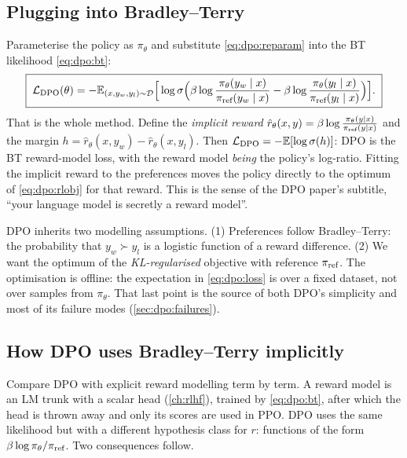 \subsection{Plugging into Bradley--Terry}

Parameterise the policy as $\pi_\theta$ and substitute \eqref{eq:dpo:reparam} into the BT
likelihood \eqref{eq:dpo:bt}:
\begin{equation}
\boxed{\;
\mathcal{L}_{\text{DPO}}(\theta) = -\mathbb{E}_{(x,y_w,y_l)\sim\mathcal{D}}\Big[\log\sigma\Big(
\beta\log\frac{\pi_\theta(y_w\mid x)}{\pi_{\text{ref}}(y_w\mid x)}
-\beta\log\frac{\pi_\theta(y_l\mid x)}{\pi_{\text{ref}}(y_l\mid x)}\Big)\Big].\;}
\label{eq:dpo:loss}
\end{equation}
That is the whole method. Define the \emph{implicit reward}
$\hat r_\theta(x,y)=\beta\log\frac{\pi_\theta(y\mid x)}{\pi_{\text{ref}}(y\mid x)}$ and the margin
$h=\hat r_\theta(x,y_w)-\hat r_\theta(x,y_l)$. Then $\mathcal{L}_{\text{DPO}}=-\mathbb{E}[\log\sigma(h)]$:
DPO is the BT reward-model loss, with the reward model \emph{being} the policy's log-ratio. Fitting the
implicit reward to the preferences moves the policy directly to the optimum of
\eqref{eq:dpo:rlobj} for that reward. This is the sense of the DPO paper's subtitle, ``your
language model is secretly a reward model''.

\begin{keyidea}
DPO inherits two modelling assumptions. (1) Preferences follow Bradley--Terry: the probability that
$y_w\succ y_l$ is a logistic function of a reward difference. (2) We want the optimum of the
\emph{KL-regularised} objective with reference $\pi_{\text{ref}}$. The optimisation is offline: the expectation in
\eqref{eq:dpo:loss} is over a fixed dataset, not over samples from $\pi_\theta$. That last point
is the source of both DPO's simplicity and most of its failure modes (\cref{sec:dpo:failures}).
\end{keyidea}

\subsection{How DPO uses Bradley--Terry implicitly}

Compare DPO with explicit reward modelling term by term. A reward model is an LM trunk with a
scalar head (\cref{ch:rlhf}), trained by \eqref{eq:dpo:bt}, after which the head is thrown away
and only its scores are used in PPO. DPO uses the same likelihood but with a different hypothesis
class for $r$: functions of the form $\beta\log\pi_\theta/\pi_{\text{ref}}$. Two consequences follow.

